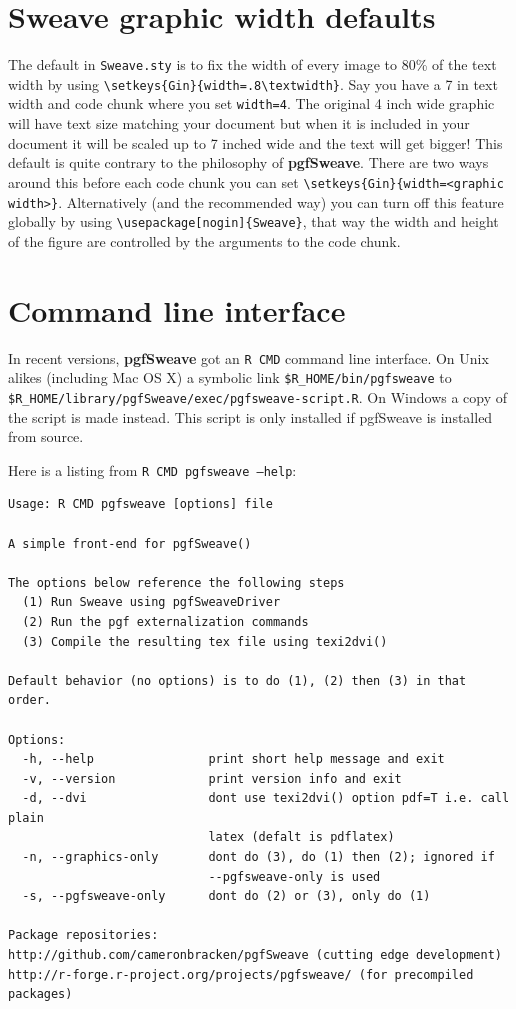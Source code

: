 \documentclass{article}
\newcommand{\code}{\texttt}
\newcommand{\pkg}{\textbf}
\begin{document}
\section{Sweave graphic width defaults}

The default in \code{Sweave.sty} is to fix the width of every image to 80\% of the text width by using \verb"\setkeys{Gin}{width=.8\textwidth}".  Say you have a 7 in text width and code chunk where you set \code{width=4}.  The original 4 inch wide graphic will have text size matching your document but when it is included in your document it will be scaled up to 7 inched wide and the text will get bigger!  This default is quite contrary to the philosophy of \pkg{pgfSweave}.  There are two ways around this before each code chunk you can set \verb"\setkeys{Gin}{width=<graphic width>}". Alternatively (and the recommended way) you can turn off this feature globally by using \verb"\usepackage[nogin]{Sweave}", that way the width and height of the figure are controlled by the arguments to the code chunk. 

\section{Command line interface\label{commandline}}

In recent versions, \pkg{pgfSweave} got an \code{R CMD} command line interface.  On Unix alikes (including Mac OS X) a symbolic link \code{\$R\_HOME/bin/pgfsweave} to \code{\$R\_HOME/library/pgfSweave/exec/pgfsweave-script.R}.  On Windows a copy of the script is made instead.  {\color{red} This script is only installed if pgfSweave is installed from source}.

Here is a listing from \code{R CMD pgfsweave --help}:

\begin{Verbatim}[frame=single]
Usage: R CMD pgfsweave [options] file

A simple front-end for pgfSweave()

The options below reference the following steps 
  (1) Run Sweave using pgfSweaveDriver
  (2) Run the pgf externalization commands
  (3) Compile the resulting tex file using texi2dvi()

Default behavior (no options) is to do (1), (2) then (3) in that order.

Options:
  -h, --help                print short help message and exit
  -v, --version             print version info and exit
  -d, --dvi                 dont use texi2dvi() option pdf=T i.e. call plain 
                            latex (defalt is pdflatex)
  -n, --graphics-only       dont do (3), do (1) then (2); ignored if 
                            --pgfsweave-only is used
  -s, --pgfsweave-only      dont do (2) or (3), only do (1)

Package repositories: 
http://github.com/cameronbracken/pgfSweave (cutting edge development)
http://r-forge.r-project.org/projects/pgfsweave/ (for precompiled packages)
\end{Verbatim}
\end{document}
